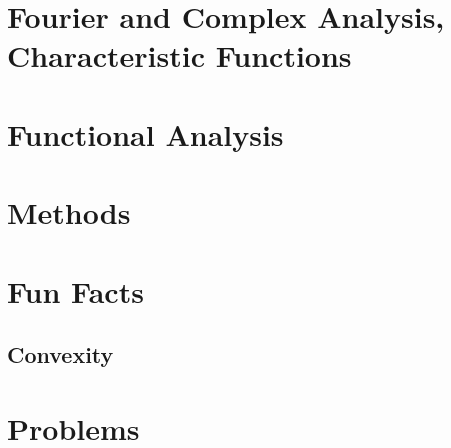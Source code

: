 \documentclass[12pt, oneside]{book}
\begin{document}
    \chapter{Fourier and Complex Analysis, Characteristic Functions}
    \chapter{Functional Analysis}
    \chapter{Methods}
    \chapter{Fun Facts}
        \section{Convexity}
    \chapter{Problems}
\end{document}
